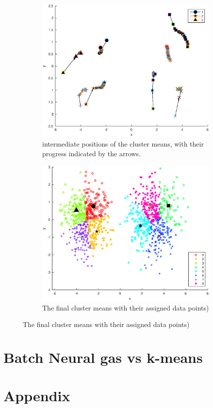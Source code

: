 \documentclass[10pt]{article}
\begin{document}
\begin{figure}[H]
  \centering
  \caption{Results for k=8}
  \begin{subfigure}[b]{.45\textwidth}
    \includegraphics[width=\columnwidth]{Fig1_k8.eps}
    \caption{intermediate positions of the cluster means, 
    with their progress indicated by the arrows.}
  \end{subfigure}
  \quad
  \begin{subfigure}[b]{.45\textwidth}
    \includegraphics[width=\columnwidth]{Fig2_k8.eps}
    \caption{The final cluster means with their assigned data points)}
  \end{subfigure}
\end{figure}




\section{Batch Neural gas vs k-means}
\section*{Appendix}
{\label{kmeans}}
{\label{runKMeans}}
\end{document}
